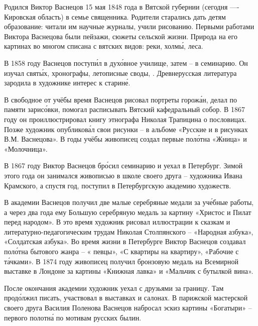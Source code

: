 Родился Виктор Васнецов 15 мая 1848 года в Вятской губернии (сегодня —- Кировская область) в семье священника. Родители старались дать детям  образование: читали им научные журналы, учили рисованию. Первыми работами Виктора Васнецова были пейзажи, сюжеты сельской жизни. Природа на его картинах во многом списана с вятских видов:  реки, холм\'{ы},   леса.

В 1858 году Васнецов поступ\'{и}л в дух\'{о}вное училище, затем -- в семинарию. Он изучал  свят\'{ы}х, хронографы, летописные своды, . Древнерусская литература зародила в художнике интерес к старин\'{е}.

В свободное от учёбы время Васнецов рисовал портреты горож\'{а}н, делал по памяти зарис\'{о}вки, помогал расписывать Вятский кафедральный собор. В 1867 году он проиллюстрировал книгу этнографа Николая Трапицина о пословицах. Позже художник опубликов\'{а}л свои рисунки  -- в альбоме «Русские  и  в рисунках В.М. Васнецова». В годы учёбы живописец создал первые пол\'{о}тна «Жница» и «Молочница».

В 1867 году Виктор Васнецов бр\'{о}сил семинарию и уехал в Петербург. Зимой этого года он занимался живописью в школе своего друга -- художника Ивана Крамского, а спустя год, поступил в Петербургскую академию художеств.

В академии Васнецов получил две малые серебряные медали за уч\'{е}бные работы, а через два года ему  Большую серебряную медаль за картину «Христос и Пилат перед народом». В это время художник рисовал иллюстрации к сказкам и литературно-педагогическим трудам Николая Столпянского -- «Народная азбука», «Солдатская азбука». Во время жизни в Петербурге Виктор Васнецов создавал пол\'{о}тна бытового жанра -- « певцы», «С квартиры на квартиру», «Рабочие с т\'{а}чками». В 1874 году живописец получил бронзовую медаль на Всемирной выставке в Лондоне за картины «Книжная лавка» и «Мальчик с бутылкой вина».

После окончания академии художник уехал с друзьями за границу. Там прод\'{о}лжил писать, участвовал в выставках и салонах. В парижской мастерской своего друга Василия Поленова Васнецов набросал эскиз картины «Богатыри» -- первого полотн\'{а} по мотивам русских былин.

